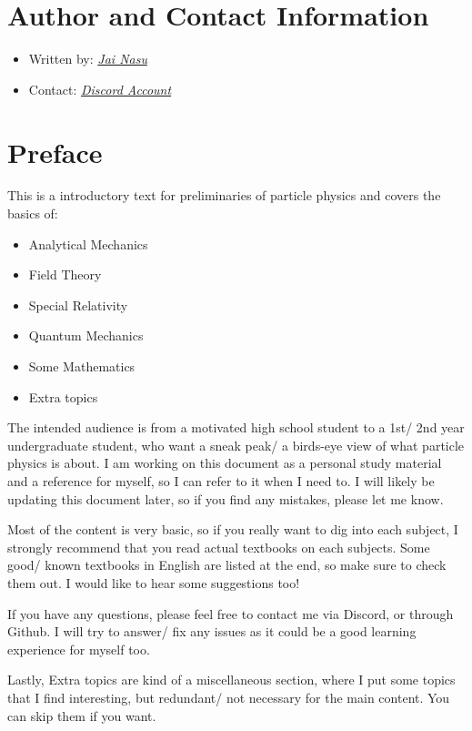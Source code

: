 \section*{Author and Contact Information}
\begin{itemize}
  \item Written by: \href{https://github.com/JaiNasu}{\emph{Jai Nasu}}
  \item Contact: \href{https://discordapp.com/users/475766542181859331}{\emph{Discord Account}}
\end{itemize}

\section*{Preface}

This is a introductory text for preliminaries of particle physics and covers the basics of:
\begin{itemize}
  \item Analytical Mechanics
  \item Field Theory
  \item Special Relativity
  \item Quantum Mechanics
  \item Some Mathematics
  \item Extra topics
\end{itemize}

The intended audience is from a motivated high school student to a 1st/ 2nd year undergraduate student, who want a sneak peak/ a birds-eye view of what particle physics is about.
I am working on this document as a personal study material and a reference for myself, so I can refer to it when I need to.
I will likely be updating this document later, so if you find any mistakes, please let me know.

Most of the content is very basic, so if you really want to dig into each subject, I strongly recommend that you read actual textbooks on each subjects.
Some good/ known textbooks in English are listed at the end, so make sure to check them out. I would like to hear some suggestions too!

If you have any questions, please feel free to contact me via Discord, or through Github.
I will try to answer/ fix any issues as it could be a good learning experience for myself too.

Lastly, Extra topics are kind of a miscellaneous section, where I put some topics that I find interesting, but redundant/ not necessary for the main content. You can skip them if you want.

